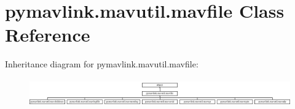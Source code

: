 \hypertarget{classpymavlink_1_1mavutil_1_1mavfile}{}\section{pymavlink.\+mavutil.\+mavfile Class Reference}
\label{classpymavlink_1_1mavutil_1_1mavfile}
Inheritance diagram for pymavlink.\+mavutil.\+mavfile\+:\begin{figure}[H]
\begin{center}
\leavevmode
\includegraphics[height=1.200000cm]{classpymavlink_1_1mavutil_1_1mavfile}
\end{center}
\end{figure}
